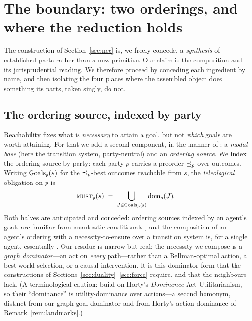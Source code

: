 

\section{The boundary: two orderings, and where the reduction holds}
\label{sec:boundary}

The construction of Section~\ref{sec:nec} is, we freely concede, a \emph{synthesis} of
established parts rather than a new primitive. Our claim is the composition and its
jurisprudential reading. We therefore proceed by conceding each ingredient by name, and
then isolating the four places where the assembled object does something its parts,
taken singly, do not.

\subsection{The ordering source, indexed by party}
\label{sec:ordering}

Reachability fixes what is \emph{necessary} to attain a goal, but not \emph{which} goals
are worth attaining. For that we add a second component, in the manner of
: a \emph{modal base} (here the transition system, party-neutral) and
an \emph{ordering source}. We index the ordering source by party: each party $p$ carries
a preorder $\preceq_{p}$ over outcomes. Writing $\operatorname{Goals}_p(s)$ for the $\preceq_{p}$-best outcomes
reachable from $s$, the \emph{teleological} obligation on $p$ is
\[
  \textsc{must}_p(s)\;=\;\bigcup_{J\in\operatorname{Goals}_p(s)} \operatorname{dom}_s(J).
\]
Both halves are anticipated and conceded: ordering sources indexed by an agent's goals
are familiar from anankastic conditionals , and the composition of an agent's ordering with a
necessity-to-ensure over a transition system is, for a single agent, essentially
. Our residue is narrow but real: the necessity we
compose is a \emph{graph dominator}---an act on \emph{every} path---rather than a
Bellman-optimal action, a best-world selection, or a causal intervention. It is this
dominator form that the constructions of Sections~\ref{sec:duality}--\ref{sec:force}
require, and that the neighbours lack. (A terminological caution:  build on Horty's \emph{Dominance} Act Utilitarianism, so their ``dominance''
is utility-dominance over actions---a second homonym, distinct from our graph
goal-dominator and from Horty's action-dominance of Remark~\ref{rem:landmarks}.)

